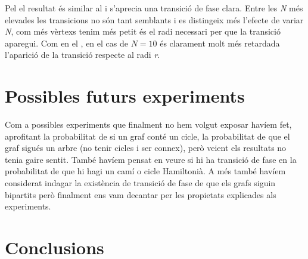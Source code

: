 Pel \RGG el resultat és similar al \BRG i s'aprecia una transició de fase clara. Entre les \emph{N} més elevades les transicions no són tant semblants i es distingeix més l'efecte de variar \emph{N}, com més vèrtexs tenim més petit és el radi necessari per que la transició aparegui. Com en el \BRG, en el cas de $N=10$ és clarament molt més retardada l'aparició de la transició respecte al radi \emph{r}.

\section{Possibles futurs experiments}
Com a possibles experiments que finalment no hem volgut exposar havíem fet, aprofitant la probabilitat de si un graf
conté un cicle, la probabilitat de que el graf sigués un arbre (no tenir cicles i ser connex), però veient els resultats
no tenia gaire sentit.  %
També havíem pensat en veure si hi ha transició de fase en la probabilitat de que hi hagi un camí o cicle Hamiltonià. 
A més també havíem considerat indagar la existència de transició de fase de que els grafs siguin bipartits però
finalment ens vam decantar per les propietats explicades als experiments.

\section{Conclusions}

\pagebreak

\printbibliography


